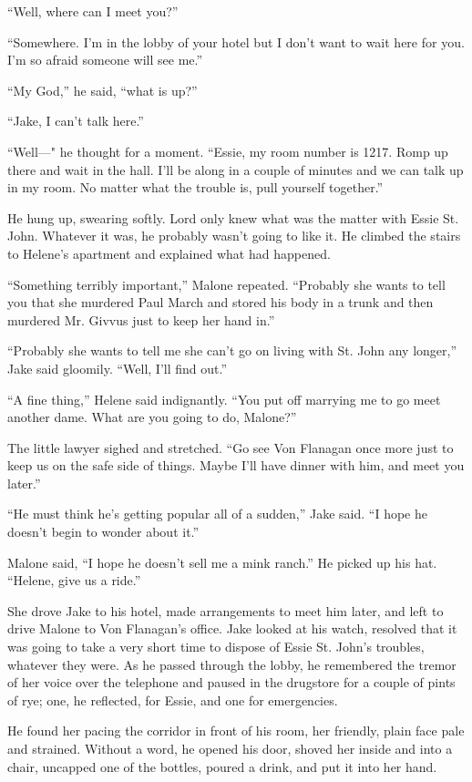 \documentclass{novel}
\begin{document}
“Well, where can I meet you?”

“Somewhere. I’m in the lobby of your hotel but I don’t want to wait here for you. I’m so afraid someone will see me.”

“My God,” he said, “what is up?”

“Jake, I can’t talk here.”

“Well—" he thought for a moment. “Essie, my room number is 1217. Romp up there and wait in the hall. I’ll be along in a couple of minutes and we can talk up in my room. No matter what the trouble is, pull yourself together.”

He hung up, swearing softly. Lord only knew what was the matter with Essie St. John. Whatever it was, he probably wasn’t going to like it. He climbed the stairs to Helene’s apartment and explained what had happened.

“Something terribly important,” Malone repeated. “Probably she wants to tell you that she murdered Paul March and stored his body in a trunk and then murdered Mr. Givvus just to keep her hand in.”

“Probably she wants to tell me she can’t go on living with St. John any longer,” Jake said gloomily. “Well, I’ll find out.”

“A fine thing,” Helene said indignantly. “You put off marrying me to go meet another dame. What are you going to do, Malone?”

The little lawyer sighed and stretched. “Go see Von Flanagan once more just to keep us on the safe side of things. Maybe I’ll have dinner with him, and meet you later.”

“He must think he’s getting popular all of a sudden,” Jake said. “I hope he doesn’t begin to wonder about it.”

Malone said, “I hope he doesn’t sell me a mink ranch.” He picked up his hat. “Helene, give us a ride.”

She drove Jake to his hotel, made arrangements to meet him later, and left to drive Malone to Von Flanagan’s office. Jake looked at his watch, resolved that it was going to take a very short time to dispose of Essie St. John’s troubles, whatever they were. As he passed through the lobby, he remembered the tremor of her voice over the telephone and paused in the drugstore for a couple of pints of rye; one, he reflected, for Essie, and one for emergencies.

He found her pacing the corridor in front of his room, her friendly, plain face pale and strained. Without a word, he opened his door, shoved her inside and into a chair, uncapped one of the bottles, poured a drink, and put it into her hand.
\end{document}
